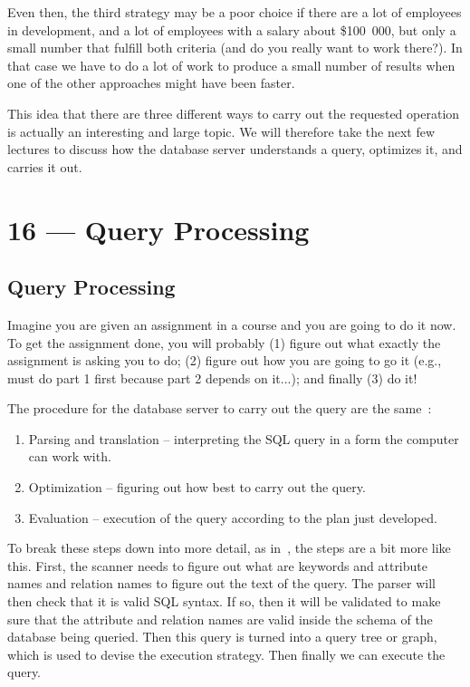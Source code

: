 \documentclass[a4paper]{report}
\begin{document}
Even then, the third strategy may be a poor choice if there are a lot of employees in development, and a lot of employees with a salary about \$100~000, but only a small number that fulfill both criteria (and do you really want to work there?). In that case we have to do a lot of work to produce a small number of results when one of the other approaches might have been faster. 

This idea that there are three different ways to carry out the requested operation is actually an interesting and large topic. We will therefore take the next few lectures to discuss how the database server understands a query, optimizes it, and carries it out. 









\chapter*{16 --- Query Processing}


\section*{Query Processing}

Imagine you are given an assignment in a course and you are going to do it now. To get the assignment done, you will probably (1) figure out what exactly the assignment is asking you to do; (2) figure out how you are going to go it (e.g., must do part 1 first because part 2 depends on it...); and finally (3) do it! 

The procedure for the database server to carry out the query are the same~\cite{dsc}:

\begin{enumerate}
	\item Parsing and translation -- interpreting the SQL query in a form the computer can work with.
	\item Optimization -- figuring out how best to carry out the query.
	\item Evaluation -- execution of the query according to the plan just developed.
\end{enumerate}

To break these steps down into more detail, as in~\cite{fds}, the steps are a bit more like this. First, the scanner needs to figure out what are keywords and attribute names and relation names to figure out the text of the query. The parser will then check that it is valid SQL syntax. If so, then it will be validated to make sure that the attribute and relation names are valid inside the schema of the database being queried. Then this query is turned into a query tree or graph, which is used to devise the execution strategy. Then finally we can execute the query.
\end{document}
